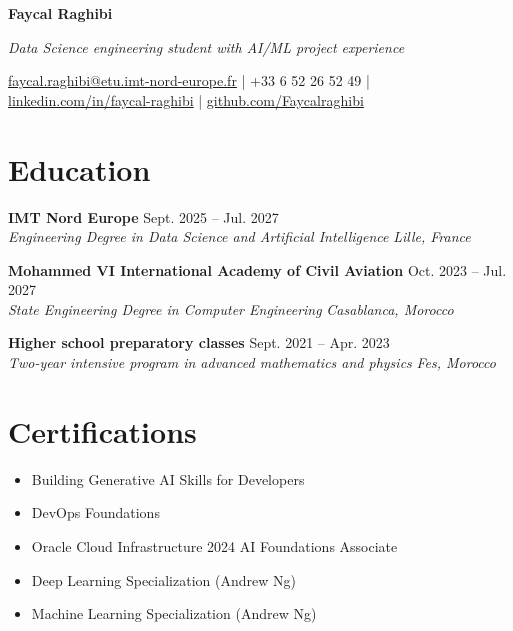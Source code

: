 \documentclass[11pt,a4paper]{article}
\newcommand{\resumeSubheading}[4]{
  \vspace{3pt}
  \noindent\textbf{#1} \hfill #2 \\
  \textit{#3} \hfill \textit{#4}
  \vspace{2pt}
}
\begin{document}
\begin{center}
{\LARGE \textbf{Faycal Raghibi}}

\vspace{2pt}
{\small\textit{Data Science engineering student with AI/ML project experience}}

\vspace{2pt}
\href{mailto:faycal.raghibi@etu.imt-nord-europe.fr}{faycal.raghibi@etu.imt-nord-europe.fr} | +33 6 52 26 52 49 | \href{https://linkedin.com/in/faycal-raghibi}{linkedin.com/in/faycal-raghibi} | \href{https://github.com/Faycalraghibi}{github.com/Faycalraghibi}
\end{center}

\section{Education}
\resumeSubheading{IMT Nord Europe}{Sept. 2025 -- Jul. 2027}{Engineering Degree in Data Science and Artificial Intelligence}{Lille, France}
\resumeSubheading{Mohammed VI International Academy of Civil Aviation}{Oct. 2023 -- Jul. 2027}{State Engineering Degree in Computer Engineering}{Casablanca, Morocco}
\resumeSubheading{Higher school preparatory classes}{Sept. 2021 -- Apr. 2023}{Two-year intensive program in advanced mathematics and physics}{Fes, Morocco}

\section{Certifications}
\begin{itemize}
  \item Building Generative AI Skills for Developers
  \item DevOps Foundations
  \item Oracle Cloud Infrastructure 2024 AI Foundations Associate
  \item Deep Learning Specialization (Andrew Ng)
  \item Machine Learning Specialization (Andrew Ng)
\end{itemize}
\end{document}
